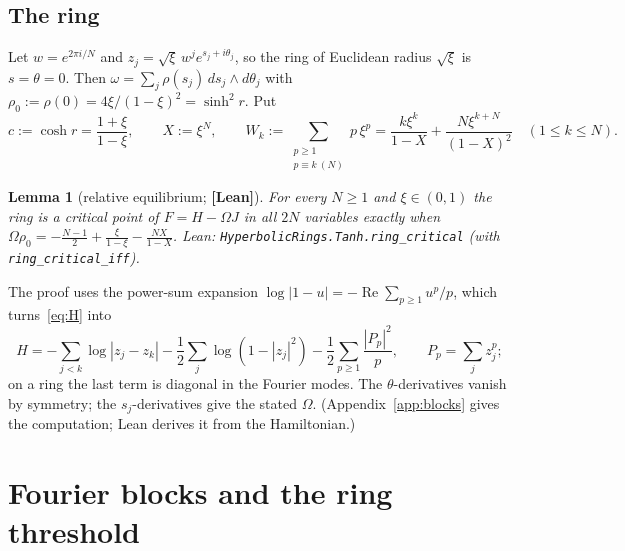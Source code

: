 \documentclass[11pt]{article}
\newtheorem{lemma}[theorem]{Lemma}
\theoremstyle{definition}
\theoremstyle{remark}
\newcommand{\st}[1]{\textbf{[#1]}}
\newcommand{\lean}[1]{\nolinkurl{#1}}
\begin{document}
\subsection{The ring}
Let $w=e^{2\pi i/N}$ and $z_j=\sqrt\xi\,w^je^{s_j+i\theta_j}$, so the ring of Euclidean radius $\sqrt\xi$ is $s=\theta=0$. Then
$\omega=\sum_j\rho(s_j)\,ds_j\wedge d\theta_j$ with $\rho_0:=\rho(0)=4\xi/(1-\xi)^2=\sinh^2r$. Put
\[
c:=\cosh r=\frac{1+\xi}{1-\xi},\qquad X:=\xi^N,\qquad W_k:=\sum_{\substack{p\ge1\\p\equiv k\ (N)}}p\,\xi^p=\frac{k\xi^k}{1-X}+\frac{N\xi^{k+N}}{(1-X)^2}\quad(1\le k\le N).
\]
\begin{lemma}[relative equilibrium; \st{Lean}]\label{lem:re}
For every $N\ge1$ and $\xi\in(0,1)$ the ring is a critical point of $F=H-\Omega J$ in all $2N$ variables exactly when
$\Omega\rho_0=-\frac{N-1}2+\frac{\xi}{1-\xi}-\frac{NX}{1-X}$.
Lean: \lean{HyperbolicRings.Tanh.ring_critical} (with \lean{ring_critical_iff}).
\end{lemma}
The proof uses the power-sum expansion $\log|1-u|=-\operatorname{Re}\sum_{p\ge1}u^p/p$, which turns~\eqref{eq:H} into
\begin{equation}\label{eq:decomp}
H=-\sum_{j<k}\log|z_j-z_k|-\frac12\sum_j\log(1-|z_j|^2)-\frac12\sum_{p\ge1}\frac{|P_p|^2}p,\qquad P_p=\sum_jz_j^p;
\end{equation}
on a ring the last term is diagonal in the Fourier modes. The $\theta$-derivatives vanish by symmetry; the $s_j$-derivatives
give the stated $\Omega$. (Appendix~\ref{app:blocks} gives the computation; Lean derives it from the Hamiltonian.)

\section{Fourier blocks and the ring threshold}\label{sec:blocks}
\end{document}
